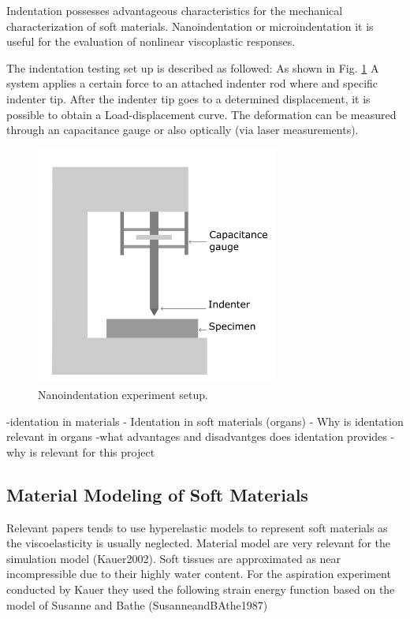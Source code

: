 Indentation possesses advantageous characteristics for the mechanical characterization
of soft materials. \cite{Liu2009}
Nanoindentation or microindentation it is useful for the evaluation of
nonlinear viscoplastic responses. \cite{Bergström2015}

The indentation testing set up is described as followed: As shown in Fig. \ref{fig:Nanoindentation} 
A system applies a certain force to an attached indenter rod where and specific 
indenter tip. After the indenter tip goes to a determined displacement, 
it is possible to obtain a Load-displacement curve.
The deformation can be measured through an capacitance gauge \cite{Bergström2015}
or also optically (via laser measurements).

 \begin{figure}[th]
        \centering
        \includegraphics[width=8cm]{Images/nanoindentationbigletter}
        \decoRule
        \caption[Nanoindentation]{Nanoindentation experiment setup.}
        \label{fig:Nanoindentation}
        \end{figure}


-identation in materials
- Identation in soft materials (organs)
- Why is identation relevant in organs
-what advantages and disadvantges does identation provides
-why is relevant for this project 

\subsection{Material Modeling of Soft Materials}
 
Relevant papers tends to use hyperelastic models to represent soft materials as the viscoelasticity 
is usually neglected. 
Material model are very relevant for the simulation model (Kauer2002).
Soft tissues are approximated as near incompressible due to their highly water content.  
For the aspiration experiment conducted by Kauer they used the following strain energy
function based on the model of Susanne and Bathe (SusanneandBAthe1987)


